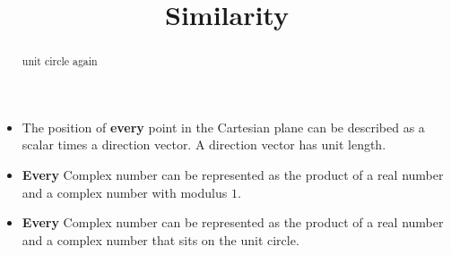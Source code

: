 \documentclass{ximera}
\title{Similarity}
\begin{document}
\begin{abstract}
unit circle again
\end{abstract}
\maketitle



\begin{itemize}
\item The position of \textbf{every} point in the Cartesian plane can be described as a scalar times a direction vector.  A direction vector has unit length.

\item \textbf{Every} Complex number can be represented as the product of a real number and a complex number with modulus $1$.


\item \textbf{Every} Complex number can be represented as the product of a real number and a complex number that sits on the unit circle.
\end{itemize}
\end{document}
